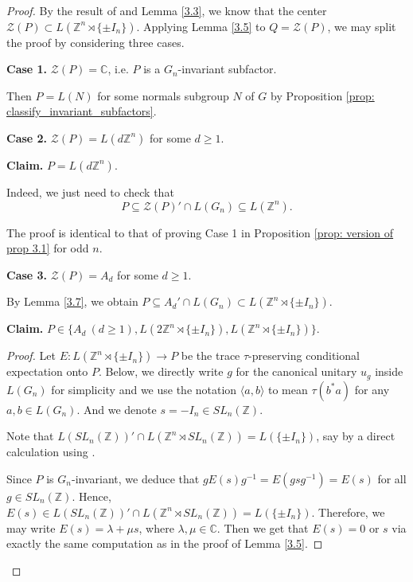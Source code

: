 \documentclass[12pt]{amsart}
\theoremstyle{definition}
\theoremstyle{remark}
\begin{document}
\begin{proof}
By the result of \cite[Theorem A]{aho} and Lemma \ref{3.3}, we know that the center $\mathcal{Z}(P) \subset L(\mathbb{Z}^n \rtimes \{\pm I_{n}\})$. Applying Lemma \ref{3.5} to $Q=\mathcal{Z}(P)$, we may split the proof by considering three cases.

\textbf{Case 1.} $\mathcal{Z}(P) = \mathbb{C}$, i.e. $P$ is a $G_{n}$-invariant subfactor.

Then $P=L(N)$ for some normals subgroup $N$ of $G$ by Proposition \ref{prop: classify_invariant_subfactors}.


\textbf{Case 2.} $\mathcal{Z}(P) = L(d\mathbb{Z}^n)$ for some $d\ge1$.

\textbf{Claim.} $P = L(d\mathbb{Z}^n)$.

Indeed, we just need to check that 
\begin{equation*}
    P\subseteq \mathcal{Z}(P)' \cap L(G_{n}) \subseteq L(\mathbb{Z}^n).
\end{equation*}

The proof is identical to that of proving Case 1 in Proposition \ref{prop: version of prop 3.1} for odd $n$.


\textbf{Case 3.} $\mathcal{Z}(P) = A_{d}$ for some $d\ge1$.

By Lemma \ref{3.7}, we obtain $P\subseteq A_{d}' \cap L(G_{n}) \subset L(\mathbb{Z}^n \rtimes \{\pm I_{n}\})$.

\textbf{Claim.}
 $P \in \{A_{d} ~(d\ge1), L(2\mathbb{Z}^n \rtimes \{\pm I_{n}\}),L(\mathbb{Z}^n \rtimes \{\pm I_{n}\})\}$.
\begin{proof}
 Let  $E: L(\mathbb{Z}^n\rtimes \{\pm{I_{n}}\})\rightarrow P$ be the trace $\tau$-preserving conditional expectation onto $P$. Below, we directly write $g$ for the canonical unitary $u_g$ inside $L(G_{n})$ for simplicity and we use the notation $\langle a, b \rangle$ to mean $\tau(b^*a)$  for any $a, b\in L(G_{n})$. And we denote $s=-I_{n}\in SL_{n}(\mathbb{Z})$.

Note that $L(SL_n(\mathbb{Z}))'\cap L(\mathbb{Z}^n\rtimes SL_n(\mathbb{Z}))=L(\{\pm I_{n}\})$, say by a direct calculation using \cite[Lemma 2.7]{aj}.


Since $P$ is $G_{n}$-invariant, we deduce that $gE(s)g^{-1}=E(gsg^{-1})=E(s)$ for all $g\in SL_n(\mathbb{Z})$. Hence, 
$E(s)\in L(SL_n(\mathbb{Z}))'\cap L(\mathbb{Z}^n\rtimes SL_n(\mathbb{Z}))=L(\{\pm I_{n}\})$. Therefore, we may write $E(s)=\lambda+\mu s$, where $\lambda,\mu\in\mathbb{C}$. Then we get that $E(s)=0$ or $s$ via exactly the same computation as in the proof of Lemma \ref{3.5}.


\end{proof}
\end{proof}
\end{document}
